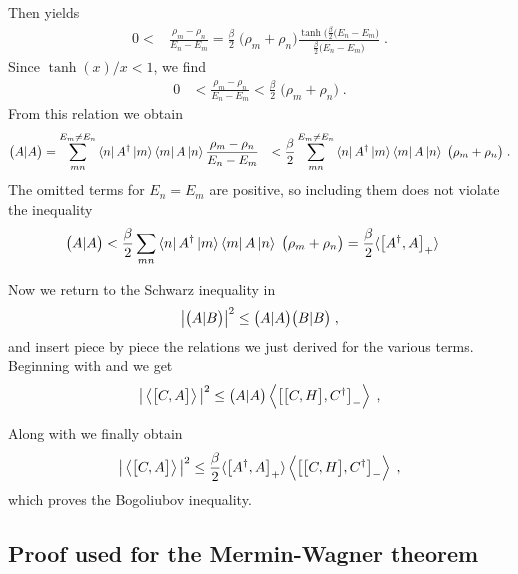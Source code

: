 %
Then  yields
%
\begin{align*}
0<&\frac{\rho_{m}-\rho_{n}}{E_{n}-E_{m}}  = \frac{\beta}{2}\;\big(\rho_{m}+\rho_{n}\big) \frac{\tanh\big(\frac{ \beta}{2}(E_{n}-E_{m} \big)}{\frac{\beta }{2} \big( E_{n}-E_{m} \big)}\;.
\end{align*}
%
Since $\tanh(x)/x < 1$, we find
\begin{align*}
0 &< \frac{\rho_{m}-\rho_{n}}{E_{n}-E_{m}} 
< \frac{\beta}{2}\;\big(\rho_{m}+\rho_{n}\big) \;.
\end{align*}
From this relation we obtain
%
\begin{align*}
\big( A|A \big) &= \sum_{mn}^{E_{m}\ne E_{n}}
\bra{n} A^{\dagger} \ket{m}\bra{m} A\ket{n}\frac{\rho_{m}-\rho_{n}}{E_{n}-E_{m}}
&< \frac{\beta}{2}\sum_{mn}^{E_{m}\ne E_{n}}
\bra{n} A^{\dagger} \ket{m}\bra{m} A\ket{n}\;\big(\rho_{m}+\rho_{n}\big)\;.
\end{align*}
%
The omitted terms for $E_{n}=E_{m}$ are positive, so including them does not violate  the inequality
%
\begin{align}\label{eq:schwarz:4}
\big( A|A \big) &< \frac{\beta}{2}\sum_{mn}
\bra{n} A^{\dagger} \ket{m}\bra{m} A\ket{n}\;\big(\rho_{m}+\rho_{n}\big)
=\frac{ \beta}{2} \langle \big[A^{\dagger},A \big]_{+}\rangle
\end{align}
%

Now we return to the Schwarz inequality in  
\begin{align}
\abs{\big( A|B \big)}^{2} \le \big( A|A \big)\big( B|B \big)\;,
\end{align}
and insert piece by piece the relations we just derived for the various terms. Beginning with  and  we get
\begin{align*}
\big|\left\langle\big[ C,A \big]\right\rangle\big|^{2}
 \le \big( A|A \big)\left\langle \big[\big[ C,H \big],C^{\dagger}\big]_{-}\right\rangle\;,
\end{align*}

Along with  we finally obtain
\begin{align}
\big|\left\langle\big[ C,A \big]\right\rangle\big|^{2}
 \le \frac{\beta}{2}\langle \big[A^{\dagger},A \big]_{+}\rangle \left\langle \big[\big[ C,H \big],C^{\dagger}\big]_{-}\right\rangle\;,
\end{align}
which proves the Bogoliubov inequality.



\subsection{Proof used for the Mermin-Wagner theorem \label{app:prove:Bogoliubov:3}}

